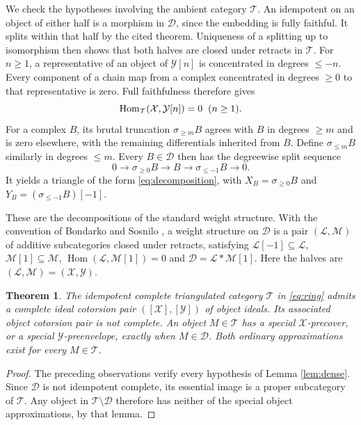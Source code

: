 \documentclass[11pt,a4paper,reqno]{amsart}
\newcommand{\Dcal}{\mathcal D}
\newcommand{\Tcal}{\mathcal T}
\newcommand{\Xcal}{\mathcal X}
\newcommand{\Hom}{\operatorname{Hom}}
\theoremstyle{plain}
\newtheorem{theorem}{Theorem}[section]
\theoremstyle{definition}
\theoremstyle{remark}
\newcommand{\Ycal}{\mathcal Y}
\begin{document}
We check the hypotheses involving the ambient category $\Tcal$. An idempotent on an object of either half is a morphism in $\Dcal$, since the embedding is fully faithful. It splits within that half by the cited theorem. Uniqueness of a splitting up to isomorphism then shows that both halves are closed under retracts in $\Tcal$. For $n\geq1$, a representative of an object of $\Ycal[n]$ is concentrated in degrees $\leq-n$. Every component of a chain map from a complex concentrated in degrees $\geq0$ to that representative is zero. Full faithfulness therefore gives
$$
\Hom_{\Tcal}(\Xcal,\Ycal[n])=0\hspace{2mm}(n\geq1).
$$
For a complex $B$, its brutal truncation $\sigma_{\geq m}B$ agrees with $B$ in degrees $\geq m$ and is zero elsewhere, with the remaining differentials inherited from $B$. Define $\sigma_{\leq m}B$ similarly in degrees $\leq m$. Every $B\in\Dcal$ then has the degreewise split sequence
$$
0\longrightarrow\sigma_{\geq0}B\longrightarrow B
\longrightarrow\sigma_{\leq-1}B\longrightarrow0.
$$
It yields a triangle of the form \eqref{eq:decomposition}, with $X_B=\sigma_{\geq0}B$ and $Y_B=(\sigma_{\leq-1}B)[-1]$.

These are the decompositions of the standard weight structure. With the convention of Bondarko and Sosnilo \cite[Definition~1.2.1 and Remark~1.2.3(1)]{BS18}, a weight structure on $\Dcal$ is a pair $(\mathcal L,\mathcal M)$ of additive subcategories closed under retracts, satisfying $\mathcal L[-1]\subseteq\mathcal L$, $\mathcal M[1]\subseteq\mathcal M$, $\Hom(\mathcal L,\mathcal M[1])=0$ and $\Dcal=\mathcal L*\mathcal M[1]$. Here the halves are $(\mathcal L,\mathcal M)=(\Xcal,\Ycal)$.

\begin{theorem}\label{thm:triangulated}
The idempotent complete triangulated category $\Tcal$ in \eqref{eq:ring} admits a complete ideal cotorsion pair $([\Xcal],[\Ycal])$ of object ideals. Its associated object cotorsion pair is not complete. An object $M\in\Tcal$ has a special $\Xcal$-precover, or a special $\Ycal$-preenvelope, exactly when $M\in\Dcal$. Both ordinary approximations exist for every $M\in\Tcal$.
\end{theorem}

\begin{proof}
The preceding observations verify every hypothesis of Lemma \ref{lem:dense}. Since $\Dcal$ is not idempotent complete, its essential image is a proper subcategory of $\Tcal$. Any object in $\Tcal\setminus\Dcal$ therefore has neither of the special object approximations, by that lemma.
\end{proof}
\end{document}
